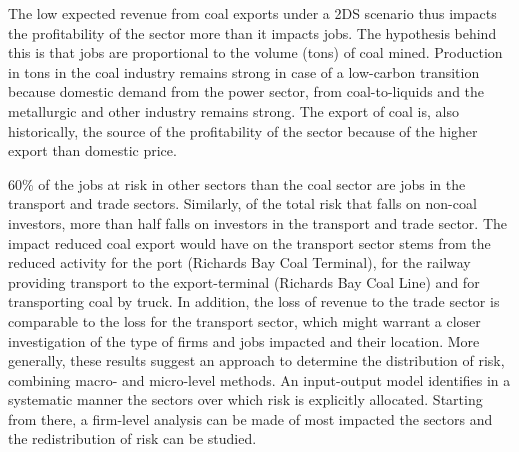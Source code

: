 \documentclass[12pt,english]{article}
\begin{document}
The low expected revenue from coal exports under a 2DS scenario thus impacts the profitability of the sector more than it impacts jobs. The hypothesis behind this is that jobs are proportional to the volume (tons) of coal mined. Production in tons in the coal industry remains strong in case of a low-carbon transition because domestic demand from the power sector, from coal-to-liquids and the metallurgic and other industry remains strong. The export of coal is, also historically, the source of the profitability of the sector because of the higher export than domestic price. 

60\% of the jobs at risk in other sectors than the coal sector are jobs in the transport and trade sectors. Similarly, of the total risk that falls on non-coal investors, more than half falls on investors in the transport and trade sector. The impact reduced coal export would have on the transport sector stems from the reduced activity for the port (Richards Bay Coal Terminal), for the railway providing transport to the export-terminal (Richards Bay Coal Line) and for transporting coal by truck. In addition, the loss of revenue to the trade sector is comparable to the loss for the transport sector, which might warrant a closer investigation of the type of firms and jobs impacted and their location. More generally, these results suggest an approach to determine the distribution of risk, combining macro- and micro-level methods. An input-output model identifies in a systematic manner the sectors over which risk is explicitly allocated. Starting from there, a firm-level analysis can be made of most impacted the sectors and the redistribution of risk can be studied.


\end{document}
